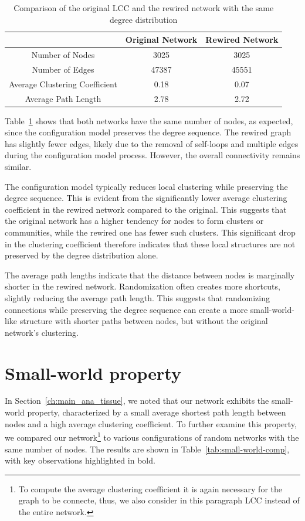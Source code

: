 \documentclass[paper=a4,fontsize=11pt,DIV=8,BCOR=5mm,oneside,pdftex,bibtotocnumbered]{scrreprt}
\theoremstyle{plain}
\begin{document}
	\begin{table}
		\caption{Comparison of the original LCC and the rewired network with the same degree distribution}
		\centering
		\begin{tabular}{|c||c|c|}
			\hline
			& Original Network & Rewired Network \\
			\hline
			Number of Nodes & 3025 & 3025 \\
			Number of Edges & 47387 & 45551 \\
			Average Clustering Coefficient & 0.18 & 0.07\\
			Average Path Length & 2.78 & 2.72 \\
			\hline
		\end{tabular}
		
		\label{tab:config_model_comp}
	\end{table}
	
	Table~\ref{tab:config_model_comp} shows that both networks have the same number of nodes, as expected, since the configuration model preserves the degree sequence. The rewired graph has slightly fewer edges, likely due to the removal of self-loops and multiple edges during the configuration model process. However, the overall connectivity remains similar.
	
	The configuration model typically reduces local clustering while preserving the degree sequence. This is evident from the significantly lower average clustering coefficient in the rewired network compared to the original. This suggests that the original network has a higher tendency for nodes to form clusters or communities, while the rewired one has fewer such clusters. This significant drop in the clustering coefficient therefore indicates that these local structures are not preserved by the degree distribution alone.
	
	The average path lengths indicate that the distance between nodes is marginally shorter in the rewired network. Randomization often creates more shortcuts, slightly reducing the average path length. This suggests that randomizing connections while preserving the degree sequence can create a more small-world-like structure with shorter paths between nodes, but without the original network's clustering.
	
	\section{Small-world property}
	In Section~\ref{ch:main_ana_tissue}, we noted that our network exhibits the small-world property, characterized by a small average shortest path length between nodes and a high average clustering coefficient. To further examine this property, we compared our network\footnote{To compute the average clustering coefficient it is again necessary for the graph to be connecte, thus, we also consider in this paragraph LCC instead of the entire network.} to various configurations of random networks with the same number of nodes. The results are shown in Table~\ref{tab:small-world-comp}, with key observations highlighted in bold.
	
\end{document}
